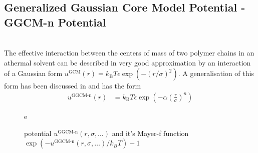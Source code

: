 \newpage
\subsection{Generalized Gaussian Core Model Potential - GGCM-n Potential}
~\\

The effective interaction between the centers of mass of two polymer chains
in an athermal solvent can be described in very good approximation
by an interaction of a Gaussian form
$u^\text{GCM}(r)= k_\text{B} T \epsilon \exp\left(-\left(r/\sigma\right)^2\right)$.
A generalisation of this form has been discussed in \cite{Mladek2005,Louis2000} and
has the form
\begin{align}
u^\text{GGCM-n}(r)&=
k_\text{B} T \epsilon \exp\left(-\alpha\left(\frac{r}{\sigma}\right)^n\right)
\end{align}

\begin{figure}[htb]
\captionsetup[subfigure]{position=b}
\centering
{}
\hfill
{}
e
\caption{potential $u^\text{GGCM-n}(r,\sigma,\ldots)$ and it's Mayer-f function $\exp(-u^\text{GGCM-n}(r,\sigma,\ldots)/k_BT)-1$}
\end{figure}



